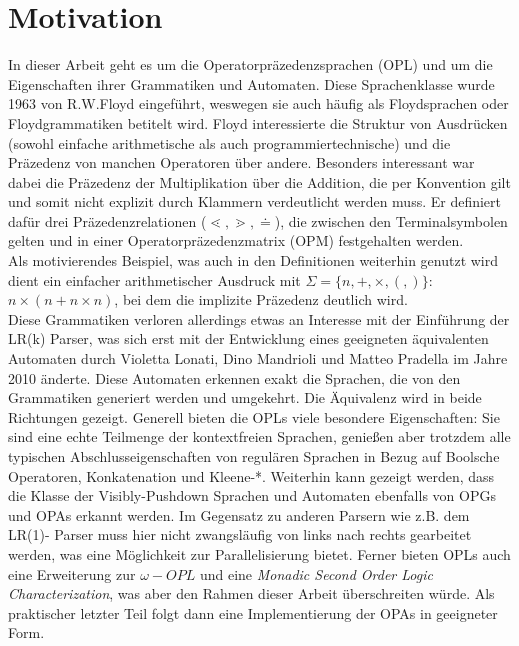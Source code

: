 \section{Motivation}
In dieser Arbeit geht es um die Operatorpräzedenzsprachen (OPL) und um die Eigenschaften ihrer Grammatiken und Automaten. Diese Sprachenklasse wurde 1963 von R.W.Floyd eingeführt, weswegen sie auch häufig als Floydsprachen oder Floydgrammatiken betitelt wird. Floyd interessierte die Struktur von Ausdrücken (sowohl einfache arithmetische als auch programmiertechnische) und die Präzedenz von manchen Operatoren über andere. Besonders interessant war dabei die Präzedenz der Multiplikation über die Addition, die per Konvention gilt und somit nicht explizit durch Klammern verdeutlicht werden muss. Er definiert dafür drei Präzedenzrelationen ($\lessdot, \gtrdot, \doteq$), die zwischen den Terminalsymbolen gelten und in einer Operatorpräzedenzmatrix (OPM) festgehalten werden.\\
Als motivierendes Beispiel, was auch in den Definitionen weiterhin genutzt wird dient ein einfacher arithmetischer Ausdruck mit $\Sigma = \{n, +, \times, (, )\}$:\\ $ n \times (n + n \times n)$, bei dem die implizite Präzedenz deutlich wird.\\
Diese Grammatiken verloren allerdings etwas an Interesse mit der Einführung der LR(k) Parser, was sich erst mit der Entwicklung eines geeigneten äquivalenten Automaten durch Violetta Lonati, Dino Mandrioli und Matteo Pradella im Jahre 2010 änderte. Diese Automaten erkennen exakt die Sprachen, die von den Grammatiken generiert werden und umgekehrt. Die Äquivalenz wird in beide Richtungen gezeigt.
Generell bieten die OPLs viele besondere Eigenschaften: Sie sind eine echte Teilmenge der kontextfreien Sprachen, genießen aber trotzdem alle typischen Abschlusseigenschaften von regulären Sprachen in Bezug auf Boolsche Operatoren, Konkatenation und Kleene-*. 
Weiterhin kann gezeigt werden, dass die Klasse der Visibly-Pushdown Sprachen und Automaten ebenfalls von OPGs und OPAs erkannt werden. Im Gegensatz zu anderen Parsern wie z.B. dem LR(1)- Parser muss hier nicht zwangsläufig von links nach rechts gearbeitet werden, was eine Möglichkeit zur Parallelisierung bietet. Ferner bieten OPLs auch eine Erweiterung zur $\omega- OPL$ und eine \textit{Monadic Second Order Logic Characterization}, was aber den Rahmen dieser Arbeit überschreiten würde.
Als praktischer letzter Teil folgt dann eine Implementierung der OPAs in geeigneter Form.